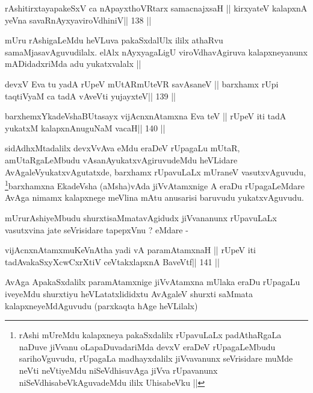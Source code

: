 
\begin{shl}
rAshitirxtayapakeSxV ca nApayxthoVR\s tarx samacnajxsaH ||
kirxyateV kalapxnA yeVna savaRnAyxyaviroVdhiniV\hfill || 138 ||
\end{shl}

\begin{artha}
mUru rAshigaLeMdu heVLuva pakaSxdalUlx ililx athaRvu
samaMjasavAguvudilalx. elAlx nAyxyagaLigU viroVdhavAgiruva
kalapxneyanunx mADidadxriMda adu yukatxvalalx ||
\end{artha}


\begin{shl}
devxV Eva tu yadA rUpeV mUtARmUteVR savAsaneV ||
barxhamx rUpi taqtiVyaM ca tadA vAveVti yujayxteV\hfill || 139 ||
\end{shl}

\begin{shl}
barxhemxYkadeVshaBUtasayx vijAcnxnAtamxna Eva teV ||
rUpeV iti tadA yukatxM kalapxnAnuguNaM vacaH\hfill || 140 ||
\end{shl}

\begin{artha}
sidAdhxMtadalilx devxVvAva eMdu eraDeV rUpagaLu  mUtaR, amUtaRgaLeMbudu
vAsanAyukatxvAgiruvudeMdu heVLidare AvAgaleVyukatxvAgutatxde, barxhamx
rUpavuLaLx mUraneV vasutxvAguvudu, \footnote[1]{rAshi mUreMdu
  kalapxneya pakaSxdalilx rUpavuLaLx padAthaRgaLa naDuve jiVvanu
  oLapaDuvadariMda devxV eraDeV rUpagaLeMbudu sarihoVguvudu, rUpagaLa
  madhayxdalilx jiVvavanunx seVrisidare muMde neVti neVtiyeMdu
  niSeVdhisuvAga jiVva rUpavanunx niSeVdhisabeVkAguvadeMdu ililx
  UhisabeVku ||}barxhamxna EkadeVsha
(aMsha)vAda jiVvAtamxnige A eraDu rUpagaLeMdare AvAga nimamx
kalapxnege meVlina mAtu anusarisi baruvudu yukatxvAguvudu.
\end{artha}

\begin{artha}
mUrurAshiyeMbudu shurxtisaMmatavAgidudx jiVvananunx rUpavuLaLx
vasutxvina jate seVrisidare tapepxVnu ? eMdare -
\end{artha}

\begin{shl}
vijAcnxnAtamxmuKeVnAtha yadi vA paramAtamxnaH ||
rUpeV iti tadA\s vakaSxyXcwCxrXtiV ceVtakxlapxnA BaveVtf\hfill || 141 ||
\end{shl}

\begin{artha}
AvAga ApakaSxdalilx paramAtamxnige jiVvAtamxna mUlaka eraDu rUpagaLu
iveyeMdu shurxtiyu heVLatatxlididxtu AvAgaleV shurxti saMmata
kalapxneyeMdAguvudu (parxkaqta hAge heVLilalx)
\end{artha}

